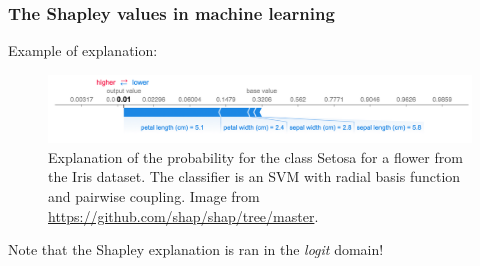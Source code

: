 \documentclass{beamer}
\begin{document}
\begin{frame}
  \frametitle{The Shapley values in machine learning}
  Example of explanation:
  \begin{figure}
    \centering
    \includegraphics[width=\linewidth]{figures/example_from_shap}
    \caption{Explanation of the probability for the class Setosa for a flower from the Iris dataset. The classifier is an SVM with radial basis function and pairwise coupling. {\tiny Image from \url{https://github.com/shap/shap/tree/master}.}}
  \end{figure}

  Note that the Shapley explanation is ran in the \emph{logit} domain!
  
\end{frame}
\end{document}
